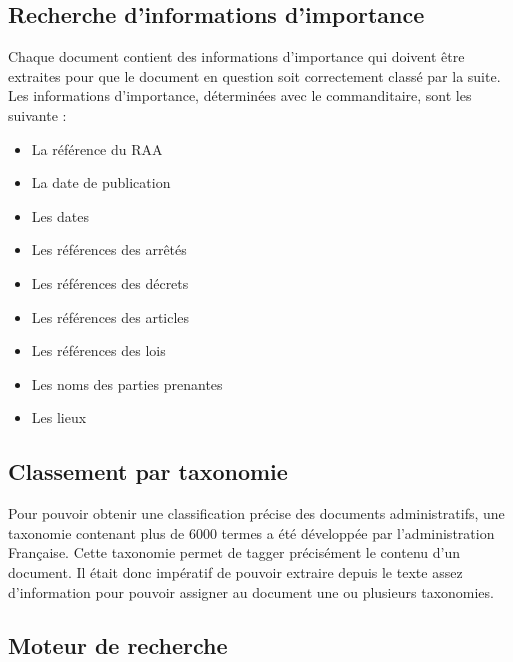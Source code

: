 

\subsection{Recherche d'informations d'importance} %
Chaque document contient des informations d'importance qui doivent être extraites pour que le document en question soit correctement classé par la suite.
Les informations d'importance, déterminées avec le commanditaire, sont les suivante :
\begin {itemize}
\item La référence du RAA
\item La date de publication
\item Les dates
\item Les références des arrêtés
\item Les références des décrets
\item Les références des articles
\item Les références des lois
\item Les noms des parties prenantes
\item Les lieux
\end {itemize}

\subsection{Classement par taxonomie}
Pour pouvoir obtenir une classification précise des documents administratifs, une taxonomie contenant plus de 6000 termes a été développée par l'administration Française. Cette taxonomie permet de tagger précisément le contenu d'un document.
Il était donc impératif de pouvoir extraire depuis le texte assez d'information pour pouvoir assigner au document une ou plusieurs taxonomies.

\subsection{Moteur de recherche}

